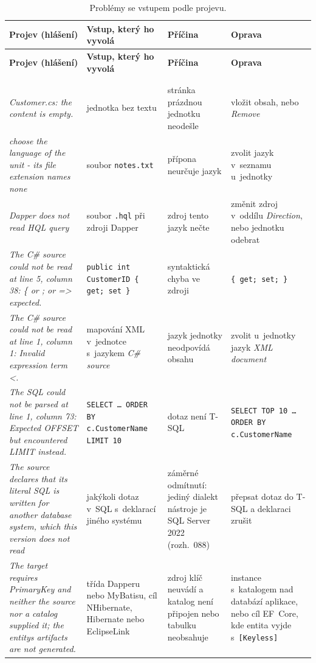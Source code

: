 {\footnotesize
\begin{longtable}{P{0.31} P{0.22} P{0.21} P{0.26}}
\toprule
\textbf{Projev (hlášení)} & \textbf{Vstup, který ho vyvolá} & \textbf{Příčina} & \textbf{Oprava} \\
\midrule
\endfirsthead
\toprule
\textbf{Projev (hlášení)} & \textbf{Vstup, který ho vyvolá} & \textbf{Příčina} & \textbf{Oprava} \\
\midrule
\endhead
\rule{0pt}{26pt}\\
\endfoot
\bottomrule
\caption{Problémy se vstupem podle projevu.}\label{tab:chyby-vstup}\\
\endlastfoot
\emph{Customer.cs: the content is empty.} & jednotka bez textu & stránka prázdnou jednotku neodešle & vložit obsah, nebo \emph{Remove} \\
\emph{choose the language of the unit - its file extension names none} & soubor \texttt{notes.txt} & přípona neurčuje jazyk & zvolit jazyk v~seznamu u~jednotky \\
\emph{Dapper does not read HQL query} & soubor \texttt{.hql} při zdroji Dapper & zdroj tento jazyk nečte & změnit zdroj v~oddílu \emph{Direction}, nebo jednotku odebrat \\
\midrule
\emph{The C\# source could not be read at line 5, column 38: \{ or ; or => expected.} & \texttt{public int CustomerID \{ get; set \}} & syntaktická chyba ve zdroji & \texttt{\{ get; set; \}} \\
\emph{The C\# source could not be read at line 1, column 1: Invalid expression term \textquotesingle{}<\textquotesingle{}.} & mapování XML v~jednotce s~jazykem \emph{C\# source} & jazyk jednotky neodpovídá obsahu & zvolit u~jednotky jazyk \emph{XML document} \\
\emph{The SQL could not be parsed at line 1, column 73: Expected OFFSET but encountered LIMIT instead.} & \texttt{SELECT \ldots{} ORDER BY c.CustomerName LIMIT 10} & dotaz není T-SQL & \texttt{SELECT TOP 10 \ldots{} ORDER BY c.CustomerName} \\
\emph{The source declares that its literal SQL is written for another database system, which this version does not read} & jakýkoli dotaz v~SQL s~deklarací jiného systému & záměrné odmítnutí: jediný dialekt nástroje je SQL Server 2022 (rozh.~088) & přepsat dotaz do T-SQL a deklaraci zrušit \\
\emph{The target requires PrimaryKey and neither the source nor a catalog supplied it; the entity\textquotesingle{}s artifacts are not generated.} & třída Dapperu nebo MyBatisu, cíl NHibernate, Hibernate nebo EclipseLink & zdroj klíč neuvádí a katalog není připojen nebo tabulku neobsahuje & instance s~katalogem nad databází aplikace, nebo cíl EF~Core, kde entita vyjde s~\texttt{[Keyless]} \\

\end{longtable}}
